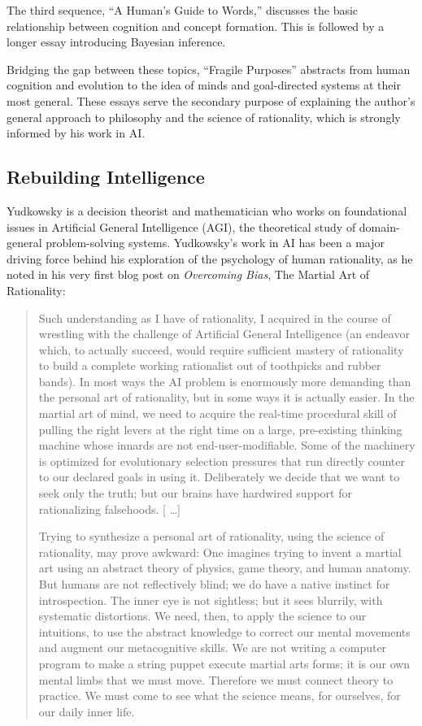  The third sequence, ``A Human's
Guide to Words,'' discusses the basic relationship
between cognition and concept formation. This is followed by a longer
essay introducing Bayesian inference.


 Bridging the gap between these topics, ``Fragile
Purposes'' abstracts from human cognition and
evolution to the idea of minds and goal-directed systems at their most
general. These essays serve the secondary purpose of explaining the
author's general approach to philosophy and the science
of rationality, which is strongly informed by his work in AI.

\subsection{Rebuilding Intelligence}


 Yudkowsky is a decision theorist and mathematician who works on
foundational issues in Artificial General Intelligence (AGI), the
theoretical study of domain-general problem-solving systems.
Yudkowsky's work in AI has been a major driving force
behind his exploration of the psychology of human rationality, as he
noted in his very first blog post on \textit{Overcoming Bias}, The
Martial Art of Rationality:

\begin{quotation}

 Such understanding as I have of rationality, I acquired in the
course of wrestling with the challenge of Artificial General
Intelligence (an endeavor which, to actually succeed, would require
sufficient mastery of rationality to build a complete working
rationalist out of toothpicks and rubber bands). In most ways the AI
problem is enormously more demanding than the personal art of
rationality, but in some ways it is actually easier. In the martial art
of mind, we need to acquire the real-time procedural skill of pulling
the right levers at the right time on a large, pre-existing thinking
machine whose innards are not end-user-modifiable. Some of the
machinery is optimized for evolutionary selection pressures that run
directly counter to our declared goals in using it. Deliberately we
decide that we want to seek only the truth; but our brains have
hardwired support for rationalizing falsehoods. [ \ldots ]

{
 Trying to synthesize a personal art of rationality, using the
science of rationality, may prove awkward: One imagines trying to
invent a martial art using an abstract theory of physics, game theory,
and human anatomy. But humans are not reflectively blind; we do have a
native instinct for introspection. The inner eye is not sightless; but
it sees blurrily, with systematic distortions. We need, then, to apply
the science to our intuitions, to use the abstract knowledge to correct
our mental movements and augment our metacognitive skills. We are not
writing a computer program to make a string puppet execute martial arts
forms; it is our own mental limbs that we must move. Therefore we must
connect theory to practice. We must come to see what the science means,
for ourselves, for our daily inner life.}
\end{quotation}


